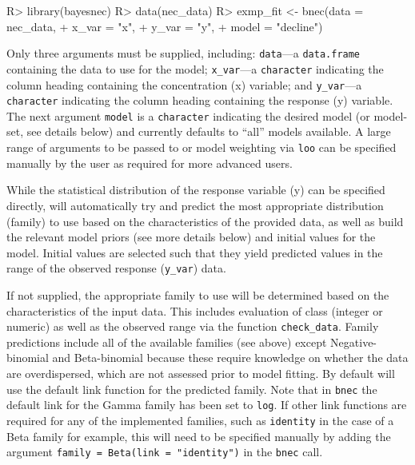 \documentclass[
]{jss}
\begin{document}
\begin{CodeChunk}
\begin{CodeInput}
R> library(bayesnec)
R> data(nec_data)
R> exmp_fit <- bnec(data = nec_data, 
+                  x_var = "x", 
+                  y_var = "y", 
+                  model = "decline")
\end{CodeInput}
\end{CodeChunk}

Only three arguments must be supplied, including: \texttt{data}---a
\texttt{data.frame} containing the data to use for the model;
\texttt{x\_var}---a \texttt{character} indicating the column heading
containing the concentration (x) variable; and \texttt{y\_var}---a
\texttt{character} indicating the column heading containing the response
(y) variable. The next argument \texttt{model} is a \texttt{character}
indicating the desired model (or model-set, see details below) and
currently defaults to ``all'' models available. A large range of
arguments to be passed to  or model weighting via \texttt{loo}
can be specified manually by the user as required for more advanced
users.

While the statistical distribution of the response variable (y) can be
specified directly,  will automatically try and predict
the most appropriate distribution (family) to use based on the
characteristics of the provided data, as well as build the relevant
model priors (see more details below) and initial values for the
 model. Initial values are selected such that they yield
predicted values in the range of the observed response (\texttt{y\_var})
data.

If not supplied, the appropriate family to use will be determined based
on the characteristics of the input data. This includes evaluation of
class (integer or numeric) as well as the observed range via the
function \texttt{check\_data}. Family predictions include all of the
available families (see above) except Negative-binomial and
Beta-binomial because these require knowledge on whether the data are
overdispersed, which are not assessed prior to model fitting. By default
 will use the default link function for the predicted
family. Note that in \texttt{bnec} the default link for the Gamma family
has been set to \texttt{log}. If other link functions are required for
any of the implemented families, such as \texttt{identity} in the case
of a Beta family for example, this will need to be specified manually by
adding the argument \texttt{family\ =\ Beta(link\ =\ "identity")} in the
\texttt{bnec} call.
\end{document}
